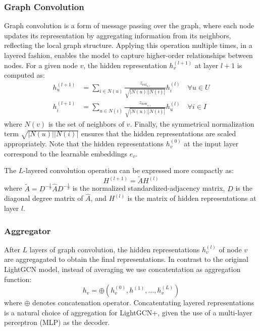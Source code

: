 \documentclass[10pt,conference,compsocconf]{IEEEtran}
\begin{document}
\subsubsection{Graph Convolution}
Graph convolution is a form of message passing over the graph, where each node updates its representation by aggregating information from its neighbors, reflecting the local graph structure. 
Applying this operation multiple times, in a layered fashion, enables the model to capture higher-order relationships between nodes.
For a given node $v$, the hidden representation $h_v^{(l+1)}$ at layer $l+1$ is computed as:
\begin{align}
    h_u^{(l+1)} &= \sum_{i \in N(u)} \frac{z_{\text{col}_{u,i}}}{\sqrt{|N(u)||N(i)|}} h_i^{(l)} \quad \forall u \in U \\
    h_i^{(l+1)} &= \sum_{u \in N(i)} \frac{z_{\text{row}_{u,i}}}{\sqrt{|N(u)||N(i)|}} h_u^{(l)}  \quad \forall i \in I
\end{align}
where $N(v)$ is the set of neighbors of $v$.
Finally, the symmetrical normalization term $\sqrt{|N(u)||N(i)|}$ ensures that the hidden representations are scaled appropriately.
Note that the hidden representations $h_v^{(0)}$ at the input layer correspond to the learnable embeddings $e_v$.

The $L$-layered convolution operation can be expressed more compactly as:
\begin{equation}
    H^{(l+1)} = \tilde{A} H^{(l)}
\end{equation}
where $\tilde{A} = D^{-\frac{1}{2}} \hat{A} D^{-\frac{1}{2}}$ is the normalized standardized-adjacency matrix, $D$ is the diagonal degree matrix of $\hat{A}$, and $H^{(l)}$ is the matrix of hidden representations at layer $l$.

\subsubsection{Aggregator}
After $L$ layers of graph convolution, the hidden representations $h_v^{(l)}$ of node $v$ are aggregagated to obtain the final representations.
In contrast to the original LightGCN model, instead of averaging we use concatentation as aggregation function:
\begin{equation}
    h_v = \oplus(h_v^{(0)}, h^{(1)}, \ldots, h_v^{(L)})
\end{equation}
where $\oplus$ denotes concatenation operator.
Concatentating layered representations is a natural choice of aggregation for LightGCN+, given the use of a multi-layer perceptron (MLP) as the decoder.
\end{document}
